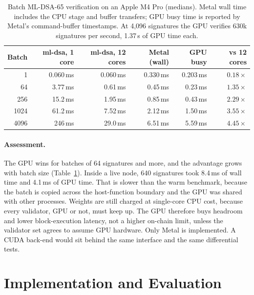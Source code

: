 \documentclass[11pt]{article}
\theoremstyle{definition}
\theoremstyle{remark}
\begin{document}
\begin{table}[ht]
\centering\small
\begin{tabular}{@{}rrrrrr@{}}
\toprule
\textbf{Batch} & \textbf{ml-dsa, 1 core} & \textbf{ml-dsa, 12 cores} & \textbf{Metal (wall)} & \textbf{GPU busy} & \textbf{vs 12 cores} \\
\midrule
1    & 0.060\,ms & 0.060\,ms & 0.330\,ms & 0.203\,ms & $0.18\times$ \\
64   & 3.77\,ms  & 0.61\,ms  & 0.45\,ms  & 0.23\,ms  & $1.35\times$ \\
256  & 15.2\,ms  & 1.95\,ms  & 0.85\,ms  & 0.43\,ms  & $2.29\times$ \\
1024 & 61.2\,ms  & 7.52\,ms  & 2.12\,ms  & 1.50\,ms  & $3.55\times$ \\
4096 & 246\,ms   & 29.0\,ms  & 6.51\,ms  & 5.59\,ms  & $4.45\times$ \\
\bottomrule
\end{tabular}
\caption{Batch ML-DSA-65 verification on an Apple M4 Pro (medians). Metal wall time includes the
CPU stage and buffer transfers; GPU busy time is reported by Metal's command-buffer timestamps.
At 4{,}096 signatures the GPU verifies 630k signatures per second, 1.37\,\textmu s of GPU time each.}
\label{tab:metal}
\end{table}

\paragraph{Assessment.} The GPU wins for batches of 64 signatures and more, and the advantage
grows with batch size (Table~\ref{tab:metal}). Inside a live node, 640 signatures took 8.4\,ms of
wall time and 4.1\,ms of GPU time. That is slower than the warm benchmark, because the batch is
copied across the host-function boundary and the GPU was shared with other processes. Weights are
still charged at single-core CPU cost, because every validator, GPU or not, must keep up. The GPU
therefore buys headroom and lower block-execution latency, not a higher on-chain limit, unless the
validator set agrees to assume GPU hardware. Only Metal is implemented. A CUDA back-end would sit
behind the same interface and the same differential tests.

\section{Implementation and Evaluation}
\label{sec:eval}
\end{document}
